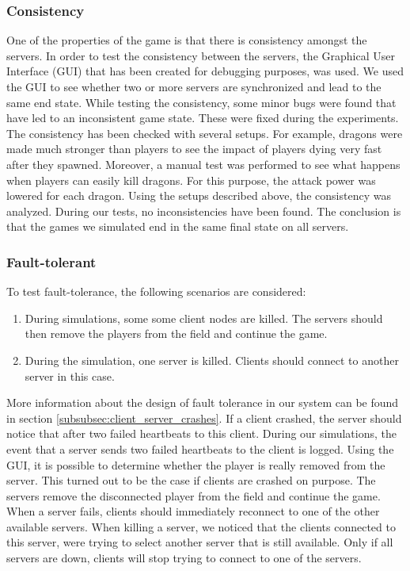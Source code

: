 	\subsubsection{Consistency}
	\label{subsubsec:consistency}
		One of the properties of the game is that there is consistency amongst the servers.
		In order to test the consistency between the servers, the Graphical User Interface (GUI) that has been created for debugging purposes, was used.
		We used the GUI to see whether two or more servers are synchronized and lead to the same end state.
		While testing the consistency, some minor bugs were found that have led to an inconsistent game state. These were fixed during the experiments.
		The consistency has been checked with several setups. For example, dragons were made much stronger than players to see the impact of players dying very fast after they spawned.
		Moreover, a manual test was performed to see what happens when players can easily kill dragons. For this purpose, the attack power was lowered for each dragon.
		Using the setups described above, the consistency was analyzed. During our tests, no inconsistencies have been found. The conclusion is that the games we simulated end in the same final state on all servers.
		
	\subsubsection{Fault-tolerant}
	\label{subsubsec:fault-tolerant}
		To test fault-tolerance, the following scenarios are considered:
		\begin{enumerate}
			\item During simulations, some some client nodes are killed. The servers should then remove the players from the field and continue the game.
			\item During the simulation, one server is killed. Clients should connect to another server in this case.
		\end{enumerate}
		
		More information about the design of fault tolerance in our system can be found in section \ref{subsubsec:client_server_crashes}. If a client crashed, the server should notice that after two failed heartbeats to this client. During our simulations, the event that a server sends two failed heartbeats to the client is logged. Using the GUI, it is possible to determine whether the player is really removed from the server. This turned out to be the case if clients are crashed on purpose. The servers remove the disconnected player from the field and continue the game.\\
		When a server fails, clients should immediately reconnect to one of the other available servers. When killing a server, we noticed that the clients connected to this server, were trying to select another server that is still available. Only if all servers are down, clients will stop trying to connect to one of the servers.
		
